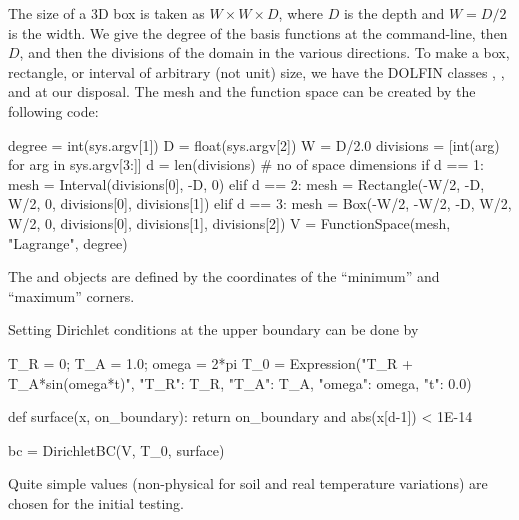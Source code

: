 The size of a 3D box is taken as $W \times W \times D$, where
$D$ is the depth and $W=D/2$ is the width.   We give the degree of the basis
functions at the command-line, then $D$, and then the divisions of the
domain in the various directions.  To make a box, rectangle, or interval
of arbitrary (not unit) size, we have the DOLFIN classes ,
, and  at our disposal. The mesh and the
function space can be created by the following code:
\begin{python}
degree = int(sys.argv[1])
D = float(sys.argv[2])
W = D/2.0
divisions = [int(arg) for arg in sys.argv[3:]]
d = len(divisions)  # no of space dimensions
if d == 1:
    mesh = Interval(divisions[0], -D, 0)
elif d == 2:
    mesh = Rectangle(-W/2, -D, W/2, 0, divisions[0], divisions[1])
elif d == 3:
    mesh = Box(-W/2, -W/2, -D, W/2, W/2, 0,
               divisions[0], divisions[1], divisions[2])
V = FunctionSpace(mesh, "Lagrange", degree)
\end{python}
The  and  objects are defined by the coordinates
of the ``minimum'' and ``maximum'' corners.

Setting Dirichlet conditions at the upper boundary can be done by
\begin{python}
T_R = 0; T_A = 1.0; omega = 2*pi
T_0 = Expression("T_R + T_A*sin(omega*t)",
                 {"T_R": T_R, "T_A": T_A, "omega": omega, "t": 0.0})

def surface(x, on_boundary):
    return on_boundary and abs(x[d-1]) < 1E-14

bc = DirichletBC(V, T_0, surface)
\end{python}
Quite simple values (non-physical for soil and real temperature variations)
are chosen for the initial testing.

